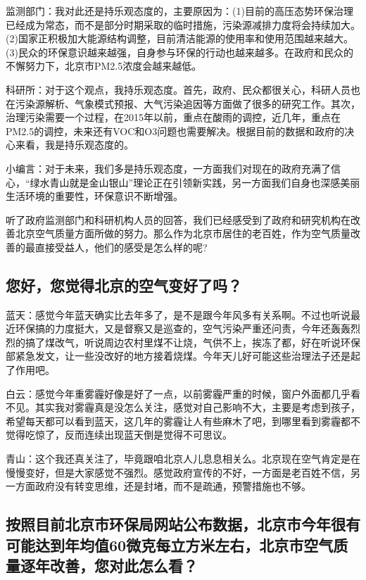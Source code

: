 \documentclass[]{book}
\begin{document}
监测部门：我对此还是持乐观态度的，主要原因为：(1)目前的高压态势环保治理已经成为常态，而不是部分时期采取的临时措施，污染源减排力度将会持续加大。(2)国家正积极加大能源结构调整，目前清洁能源的使用率和使用范围越来越大。(3)民众的环保意识越来越强，自身参与环保的行动也越来越多。在政府和民众的不懈努力下，北京市PM2.5浓度会越来越低。

科研所：对于这个观点，我持乐观态度。首先，政府、民众都很关心，科研人员也在污染源解析、气象模式预报、大气污染追因等方面做了很多的研究工作。其次，治理污染需要一个过程，在2015年以前，重点在酸雨的调控，近几年，重点在PM2.5的调控，未来还有VOC和O3问题也需要解决。根据目前的数据和政府的决心来看，我是持乐观态度的。

小编言：对于未来，我们多是持乐观态度，一方面我们对现在的政府充满了信心，``绿水青山就是金山银山''理论正在引领新实践，另一方面我们自身也深感美丽生活环境的重要性，环保意识不断增强。

听了政府监测部门和科研机构人员的回答，我们已经感受到了政府和研究机构在改善北京空气质量方面所做的努力。那么作为北京市居住的老百姓，作为空气质量改善的最直接受益人，他们的感受是怎么样的呢?

\subsection{您好，您觉得北京的空气变好了吗？}

蓝天：感觉今年蓝天确实比去年多了，是不是跟今年风多有关系啊。不过也听说最近环保搞的力度挺大，又是督察又是巡查的，空气污染严重还问责，今年还轰轰烈烈的搞了煤改气，听说周边农村里煤不让烧，气供不上，挨冻了都，好在听说环保部紧急发文，让一些没改好的地方接着烧煤。今年天儿好可能这些治理法子还是起了作用吧。

白云：感觉今年重雾霾好像是好了一点，以前雾霾严重的时候，窗户外面都几乎看不见。其实我对雾霾真是没怎么关注，感觉对自己影响不大，主要是考虑到孩子，希望每天都可以看到蓝天，这几年的雾霾让人有些麻木了吧，到哪里看到雾霾都不觉得吃惊了，反而连续出现蓝天倒是觉得不可思议。

青山：这个我还真关注了，毕竟跟咱北京人儿息息相关么。北京现在空气肯定是在慢慢变好，但是大家感觉不强烈。感觉政府宣传的不好，一方面是老百姓不信，另一方面政府没有转变思维，还是封堵，而不是疏通，预警措施也不够。

\subsection{按照目前北京市环保局网站公布数据，北京市今年很有可能达到年均值60微克每立方米左右，北京市空气质量逐年改善，您对此怎么看？}\label{60}
\end{document}
